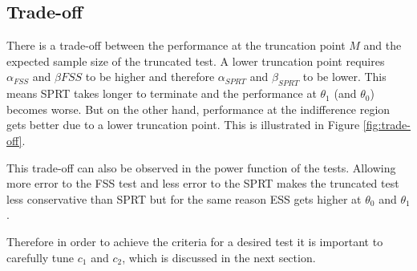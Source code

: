 \documentclass[11pt]{article}
\begin{document}
\subsection{Trade-off}

There is a trade-off between the performance at the truncation point $M$ and the expected sample size of the truncated test. A lower truncation point requires $\alpha_{FSS}$ and $\beta{FSS}$ to be higher and therefore $\alpha_{SPRT}$ and $\beta_{SPRT}$ to be lower. This means SPRT takes longer to terminate and the performance at $\theta_1$ (and $\theta_0$) becomes worse. But on the other hand, performance at the indifference region gets better due to a lower truncation point. This is illustrated in Figure \ref{fig:trade-off}.

This trade-off can also be observed in the power function of the tests. Allowing more error to the FSS test and less error to the SPRT makes the truncated test less conservative than SPRT but for the same reason ESS gets higher at $\theta_0$ and $\theta_1$.

Therefore in order to achieve the criteria for a desired test it is important to carefully tune $c_1$ and $c_2$, which is discussed in the next section.
\end{document}

